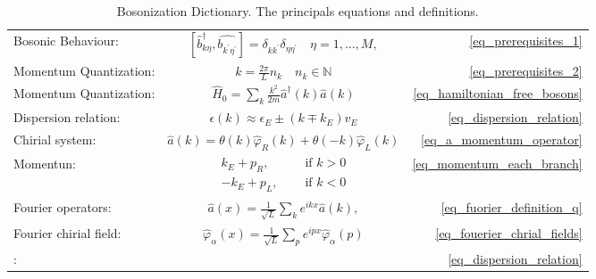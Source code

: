 \begin{table}[h!]
  \captionsetup{justification=raggedright, singlelinecheck=false}
  \renewcommand{\arraystretch}{1.5} %
  \caption{Bosonization Dictionary. The principals equations and definitions.}
  \begin{tabularx}{\textwidth}{l C r}
    \hline\hline
    Bosonic Behaviour: & $\left[ \hat{b}_{k \eta}^{\dagger} , \hat{b_{k^{\prime} \eta^\prime}} \right] = \delta_{kk^{\prime}} \delta_{\eta \eta^\prime}   \quad \eta = 1,...,M,$ &  \eqref{eq_prerequisites_1} \\
    Momentum Quantization: & $k = \frac{2\pi}{L} n_k \quad n_k \in \mathbb{N} $ & \eqref{eq_prerequisites_2} \\
    Momentum Quantization: & $\hat{H}_0 = \sum_k \frac{k^2}{2m} \hat{a}^{\dagger}(k) \hat{a}(k)$ & \eqref{eq_hamiltonian_free_bosons} \\
    Dispersion relation: &     $\epsilon(k) \approx \epsilon_{E} \pm\left(k \mp k_{E}\right) v_{E}$
 & \eqref{eq_dispersion_relation} \\
    Chirial system: &    $    \hat{a}(k)=\theta(k) \hat{\varphi}_{R}(k)+\theta(-k) \hat{\varphi}_{L}(k) $ & \eqref{eq_a_momentum_operator} \\
    Momentun: &    $        \begin{aligned}
            k_{E}+p_{R}, &\quad \text { if } k>0 \\
            -k_{E}+p_{L}, &\quad \text { if } k<0
        \end{aligned} $ & \eqref{eq_momentum_each_branch} \\
    Fourier operators: & $        \hat{a}(x)  =\frac{1}{\sqrt{L}} \sum_{k} e^{i k x} \hat{a}(k),
 $ & \eqref{eq_fuorier_definition_q} \\
    Fourier chirial field: & $\hat{\varphi}_{\alpha}(x)=\frac{1}{\sqrt{L}} \sum_{p} e^{i p x} \hat{\varphi}_{\alpha}(p)$ & \eqref{eq_fouerier_chrial_fields} \\
    : &    $ $ & \eqref{eq_dispersion_relation} \\
    
    \hline\hline
  \end{tabularx} \label{table_summary_bosonization}
\end{table}

